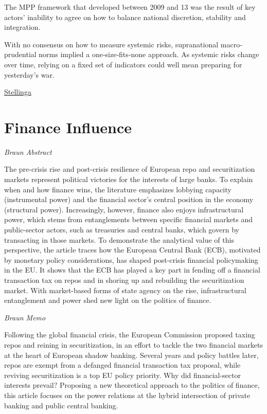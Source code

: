 \documentclass[
]{book}
\begin{document}
The MPP framework that developed between 2009 and 13 was the result of key actors' inability to agree on how to balance national discretion, stability and integration.

With no consensus on how to measure systemic risks, supranational macro‐prudential norms implied a one‐size‐fits‐none approach. As systemic risks change over time, relying on a fixed set of indicators could well mean preparing for yesterday's war.

\href{https://onlinelibrary.wiley.com/doi/full/10.1111/jcms.13195}{Stellinga}

\hypertarget{finance-influence}{%
\section{Finance Influence}\label{finance-influence}}

\emph{Braun Abstract}

The pre-crisis rise and post-crisis resilience of European repo and securitization markets represent political victories for the interests of large banks. To explain when and how finance wins, the literature emphasizes lobbying capacity (instrumental power) and the financial sector's central position in the economy (structural power). Increasingly, however, finance also enjoys infrastructural power, which stems from entanglements between specific financial markets and public-sector actors, such as treasuries and central banks, which govern by transacting in those markets. To demonstrate the analytical value of this perspective, the article traces how the European Central Bank (ECB), motivated by monetary policy considerations, has shaped post-crisis financial policymaking in the EU. It shows that the ECB has played a key part in fending off a financial transaction tax on repos and in shoring up and rebuilding the securitization market. With market-based forms of state agency on the rise, infrastructural entanglement and power shed new light on the politics of finance.

\emph{Braun Memo}

Following the global financial crisis, the European Commission proposed taxing repos and
reining in securitization, in an effort to tackle the two financial markets at the heart of
European shadow banking. Several years and policy battles later, repos are exempt from a
defanged financial transaction tax proposal, while reviving securitization is a top EU policy
priority. Why did financial-sector interests prevail? Proposing a new theoretical approach to
the politics of finance, this article focuses on the power relations at the hybrid intersection of
private banking and public central banking.
\end{document}
